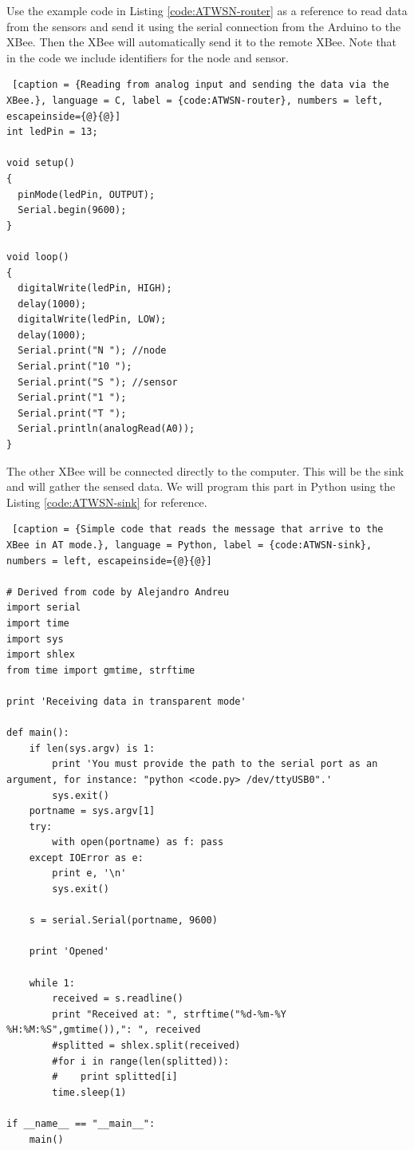 Use the example code in Listing \ref{code:ATWSN-router} as a reference to read data from the sensors and send it using the serial connection from the Arduino to the XBee. 
Then the XBee will automatically send it to the remote XBee.
Note that in the code we include identifiers for the node and sensor.

\begin{lstlisting} [caption = {Reading from analog input and sending the data via the XBee.}, language = C, label = {code:ATWSN-router}, numbers = left, escapeinside={@}{@}]
int ledPin = 13;

void setup()
{
  pinMode(ledPin, OUTPUT);
  Serial.begin(9600);
}

void loop()
{
  digitalWrite(ledPin, HIGH);
  delay(1000);
  digitalWrite(ledPin, LOW);
  delay(1000);
  Serial.print("N "); //node
  Serial.print("10 ");
  Serial.print("S "); //sensor
  Serial.print("1 ");
  Serial.print("T ");
  Serial.println(analogRead(A0));
}
\end{lstlisting}


The other XBee will be connected directly to the computer.
This will be the sink and will gather the sensed data.
We will program this part in Python using the Listing \ref{code:ATWSN-sink} for reference.


\begin{lstlisting} [caption = {Simple code that reads the message that arrive to the XBee in AT mode.}, language = Python, label = {code:ATWSN-sink}, numbers = left, escapeinside={@}{@}]

# Derived from code by Alejandro Andreu
import serial
import time
import sys
import shlex
from time import gmtime, strftime

print 'Receiving data in transparent mode'

def main():
    if len(sys.argv) is 1:
        print 'You must provide the path to the serial port as an argument, for instance: "python <code.py> /dev/ttyUSB0".'
        sys.exit()
    portname = sys.argv[1]
    try:
        with open(portname) as f: pass
    except IOError as e:
        print e, '\n'
        sys.exit()

    s = serial.Serial(portname, 9600)

    print 'Opened'

    while 1:
        received = s.readline()
        print "Received at: ", strftime("%d-%m-%Y %H:%M:%S",gmtime()),": ", received
        #splitted = shlex.split(received)
        #for i in range(len(splitted)):
        #    print splitted[i]
        time.sleep(1)

if __name__ == "__main__":
    main()
\end{lstlisting}

